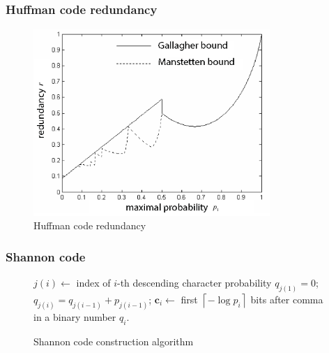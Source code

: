 \documentclass[14pt]{beamer}
\renewcommand{\vec}[1]{\ensuremath{\boldsymbol{#1}}}
\begin{document}
\begin{frame}
\frametitle{Huffman code redundancy}
\begin{itemize}    

    \begin{center}
    \begin{figure}[htbp]
    \centerline{
    \includegraphics[width=0.8\textwidth]{fig2_5.png}
    }
    \caption{Huffman code redundancy} \label{HUF_RED}
    \end{figure}
    \end{center}

\end{itemize}
\end{frame}


\begin{frame}
\frametitle{Shannon code}
\begin{itemize}    
    
    \begin{center}
    \begin{figure}
    \scalebox{0.70} {
    \begin{algorithm}[H]
    \dontprintsemicolon
      \BlankLine
      {
      $j(i)\leftarrow$ index of $i$-th descending character probability
      }
      \BlankLine
      $q_{j(1)}=0$;
      {
      $q_{j(i)}=q_{j(i-1)}+p_{j(i-1)}$;
      }
      \BlankLine
      {
      $\vec c_i\leftarrow $ first
      $\left\lceil { - \log p_i } \right\rceil $ bits after comma in a binary number $q_i$.
      }
    \end{algorithm}
    }
    \caption{Shannon code construction algorithm}
    \label{alg_sh}
    
    \end{figure}
    \end{center}

\end{itemize}
\end{frame}
\end{document}
